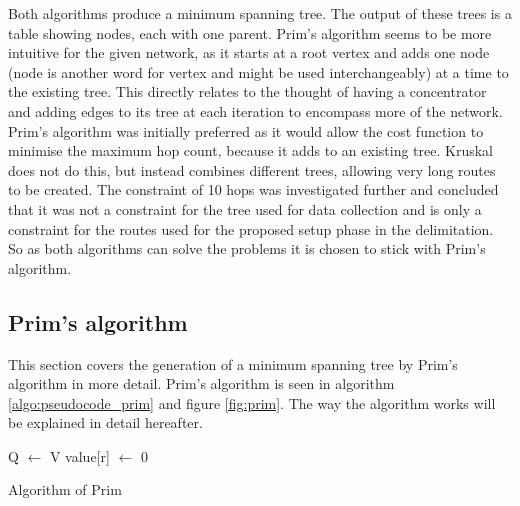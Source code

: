 Both algorithms produce a minimum spanning tree. The output of these trees is a table showing nodes, each with one parent. Prim's algorithm seems to be more intuitive for the given network, as it starts at a root vertex and adds one node (node is another word for vertex and might be used interchangeably) at a time to the existing tree. This directly relates to the thought of having a concentrator and adding edges to its tree at each iteration to encompass more of the network. Prim's algorithm was initially preferred as it would allow the cost function to minimise the maximum hop count, because it adds to an existing tree. Kruskal does not do this, but instead combines different trees, allowing very long routes to be created. The constraint of 10 hops was investigated further and concluded that it was not a constraint for the tree used for data collection and is only a constraint for the routes used for the proposed setup phase in the delimitation. So as both algorithms can solve the problems it is chosen to stick with Prim's algorithm.

\subsection{Prim's algorithm}
\label{sec:prim}
This section covers the generation of a minimum spanning tree by Prim's algorithm in more detail. Prim's algorithm is seen in algorithm \ref{algo:pseudocode_prim} and figure \ref{fig:prim}. The way the algorithm works will be explained in detail hereafter.\\
%

\begin{algorithm}
Q $\leftarrow$ V\;
value[r] $\leftarrow$ 0\;
\caption{Algorithm of Prim}
\label{algo:pseudocode_prim}
\end{algorithm}

